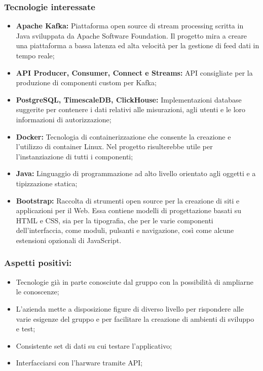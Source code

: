 	\subsubsection{Tecnologie interessate}
	\begin{itemize}
		\item \textbf{Apache Kafka:} Piattaforma open source di stream processing scritta in Java sviluppata da Apache Software Foundation. Il progetto mira a creare una piattaforma a bassa latenza ed alta velocità per la gestione di feed dati in tempo reale;
		\item \textbf{API Producer, Consumer, Connect e Streams:} API consigliate per la produzione di componenti custom per Kafka;
		\item \textbf{PostgreSQL, TimescaleDB, ClickHouse:} Implementazioni database suggerite per contenere i dati relativi alle misurazioni, agli utenti e le loro informazioni di autorizzazione;
		\item \textbf{Docker:} Tecnologia di containerizzazione che consente la creazione e l'utilizzo di container Linux. Nel progetto risulterebbe utile per l'instanziazione di tutti i componenti;   
		\item \textbf{Java:} Linguaggio di programmazione ad alto livello orientato agli oggetti e a tipizzazione statica;
		\item \textbf{Bootstrap:} Raccolta di strumenti open source per la creazione di siti e applicazioni per il Web. Essa contiene modelli di progettazione basati su HTML e CSS, sia per la tipografia, che per le varie componenti dell'interfaccia, come moduli, pulsanti e navigazione, così come alcune estensioni opzionali di JavaScript.
	\end{itemize}
	
	\subsubsection{Aspetti positivi:}
	\begin{itemize}
		\item Tecnologie già in parte conosciute dal gruppo con la possibilità di ampliarne le conoscenze;
		\item L'azienda mette a disposizione figure di diverso livello per rispondere alle varie esigenze del gruppo e per facilitare la creazione di ambienti di sviluppo e test;
		\item Consistente set di dati su cui testare l'applicativo;
		\item Interfacciarsi con l'harware tramite API;
	\end{itemize}
	
